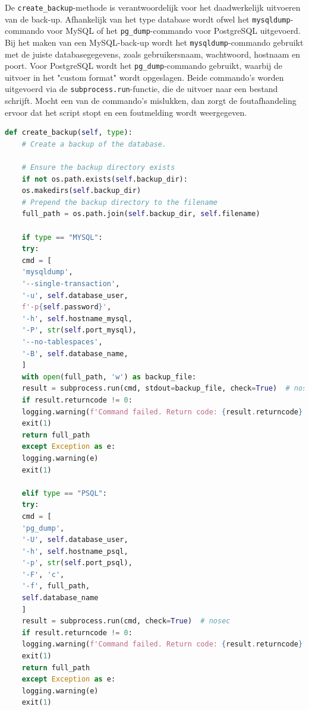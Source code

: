 De \texttt{create\_backup}-methode is verantwoordelijk voor het daadwerkelijk uitvoeren van de back-up. Afhankelijk van het type database wordt ofwel het \texttt{mysqldump}-commando voor MySQL of het \texttt{pg\_dump}-commando voor PostgreSQL uitgevoerd. Bij het maken van een MySQL-back-up wordt het \texttt{mysqldump}-commando gebruikt met de juiste databasegegevens, zoals gebruikersnaam, wachtwoord, hostnaam en poort. Voor PostgreSQL wordt het \texttt{pg\_dump}-commando gebruikt, waarbij de uitvoer in het "custom format" wordt opgeslagen. Beide commando’s worden uitgevoerd via de \texttt{subprocess.run}-functie, die de uitvoer naar een bestand schrijft. Mocht een van de commando's mislukken, dan zorgt de foutafhandeling ervoor dat het script stopt en een foutmelding wordt weergegeven.
\begin{lstlisting}[language=Python]
    def create_backup(self, type):
    # Create a backup of the database.
    
    # Ensure the backup directory exists
    if not os.path.exists(self.backup_dir):
    os.makedirs(self.backup_dir)
    # Prepend the backup directory to the filename
    full_path = os.path.join(self.backup_dir, self.filename)
    
    if type == "MYSQL":
    try:
    cmd = [
    'mysqldump',
    '--single-transaction',
    '-u', self.database_user,
    f'-p{self.password}',
    '-h', self.hostname_mysql,
    '-P', str(self.port_mysql),
    '--no-tablespaces',
    '-B', self.database_name,
    ]
    with open(full_path, 'w') as backup_file:
    result = subprocess.run(cmd, stdout=backup_file, check=True)  # nosec
    if result.returncode != 0:
    logging.warning(f'Command failed. Return code: {result.returncode}')
    exit(1)
    return full_path
    except Exception as e:
    logging.warning(e)
    exit(1)

    elif type == "PSQL":
    try:
    cmd = [
    'pg_dump',
    '-U', self.database_user,
    '-h', self.hostname_psql,
    '-p', str(self.port_psql),
    '-F', 'c',
    '-f', full_path,
    self.database_name
    ]
    result = subprocess.run(cmd, check=True)  # nosec
    if result.returncode != 0:
    logging.warning(f'Command failed. Return code: {result.returncode}')
    exit(1)
    return full_path
    except Exception as e:
    logging.warning(e)
    exit(1)
\end{lstlisting}


